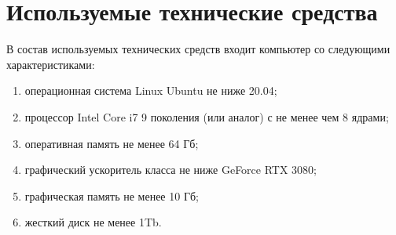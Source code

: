 \newpage
\section{Используемые технические средства}

В состав используемых технических средств входит компьютер со следующими характеристиками:
\begin{enumerate}
    \item операционная система Linux Ubuntu не ниже 20.04;
    \item процессор Intel Core i7 9 поколения (или аналог) с не менее чем 8 ядрами;
    \item оперативная память не менее 64 Гб;
    \item графический ускоритель класса не ниже GeForce RTX 3080;
    \item графическая память не менее 10 Гб;
    \item жесткий диск не менее 1Tb.        
\end{enumerate}
